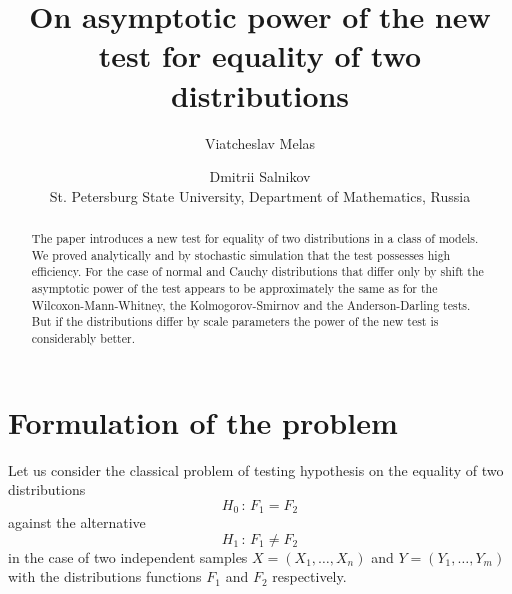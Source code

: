 \documentclass{svproc}
\begin{document}

\mainmatter              %

\title{On asymptotic power of the new test for equality of two distributions}

\author{Viatcheslav Melas \and Dmitrii Salnikov \\
    St. Petersburg State University, Department of Mathematics, Russia}


\maketitle              %

\begin{abstract}
The paper introduces a new test for equality of two distributions in a class of models.  We proved analytically and by stochastic simulation that the test possesses high efficiency. For the case of normal and Cauchy distributions that differ only by shift the asymptotic power of the test appears to be approximately the same as for the Wilcoxon-Mann-Whitney, the Kolmogorov-Smirnov and the Anderson-Darling tests. But if the distributions differ by scale parameters the power of the new test is considerably better.

\end{abstract}






\section{Formulation of the problem}
\label{S:1}
Let us consider the classical problem of testing hypothesis on the equality of two distributions
\begin{equation}
  \label{H0}
  H_0\,:\,F_1 = F_2
\end{equation}
against the alternative
\begin{equation}
  \label{H1}
  H_1\,:\,F_1 \not= F_2
\end{equation}
in the case of two independent samples $X=(X_{1},\ldots, X_{n})$ and $Y=(Y_{1},\ldots, Y_{m})$ with the distributions functions $F_1$ and $F_2$ respectively.
\end{document}
